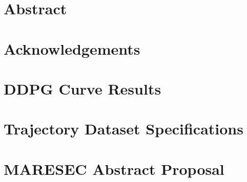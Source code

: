 \documentclass[12pt]{scrartcl}
\begin{document}

\section*{Abstract}

\newpage
\section*{Acknowledgements}

\newpage
\tableofcontents
\newpage

\listoffigures
\listoftables
\newpage
\noindent



\newpage


\newpage

\appendix
\section{DDPG Curve Results} \label{appendix:curveResults}

\section{Trajectory Dataset Specifications}\label{appendix:datasets}

\section{MARESEC Abstract Proposal}\label{appendix:maresec}

\end{document}
